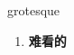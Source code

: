 
\begin{frame}
{\huge grotesque}
\begin{center}
\begin{enumerate}\Large
  \item \textbf{难看的}
\end{enumerate}
\end{center}
\end{frame}
